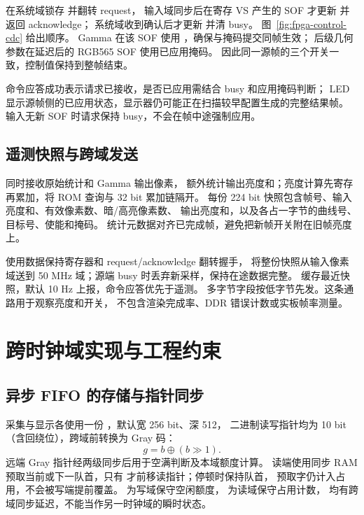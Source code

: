  在系统域锁存  并翻转 request，
输入域同步后在寄存 VS 产生的 SOF 才更新  并返回 acknowledge；
系统域收到确认后才更新  并清 busy。
图~\ref{fig:fpga-control-cdc} 给出顺序。
Gamma 在该 SOF 使用 ，确保与掩码提交同帧生效；
后级几何参数在延迟后的 RGB565 SOF 使用已应用掩码。
因此同一源帧的三个开关一致，控制值保持到整帧结束。


命令应答成功表示请求已接收，是否已应用需结合 busy 和应用掩码判断；
LED 显示源帧侧的已应用状态，显示器仍可能正在扫描较早配置生成的完整结果帧。
输入无新 SOF 时请求保持 busy，不会在帧中途强制应用。

\subsection{遥测快照与跨域发送}
 同时接收原始统计和 Gamma 输出像素，
额外统计输出亮度和；亮度计算先寄存再累加，将 ROM 查询与 32 bit 累加链隔开。
每份 224 bit 快照包含帧号、输入亮度和、有效像素数、暗/高亮像素数、
输出亮度和，以及各占一字节的曲线号、目标号、使能和掩码。
统计元数据对齐已完成帧，避免把新帧开关附在旧帧亮度上。

 使用数据保持寄存器和 request/acknowledge 翻转握手，
将整份快照从输入像素域送到 50 MHz 域；源端 busy 时丢弃新采样，保持在途数据完整。
 缓存最近快照，默认 10 Hz 上报，命令应答优先于遥测。
多字节字段按低字节先发。这条通路用于观察亮度和开关，
不包含渲染完成率、DDR 错误计数或实板帧率测量。

\section{跨时钟域实现与工程约束}
\subsection{异步 FIFO 的存储与指针同步}
采集与显示各使用一份 ，默认宽 256 bit、深 512，
二进制读写指针均为 10 bit（含回绕位），跨域前转换为 Gray 码：
\begin{equation}
g=b\oplus(b\gg1).
\end{equation}
远端 Gray 指针经两级同步后用于空满判断及本域额度计算。
读端使用同步 RAM 预取当前或下一队首，只有
 才前移读指针；停顿时保持队首，
预取字仍计入占用，不会被写端提前覆盖。
 为写域保守空闲额度， 为读域保守占用计数，
均有跨域同步延迟，不能当作另一时钟域的瞬时状态。

